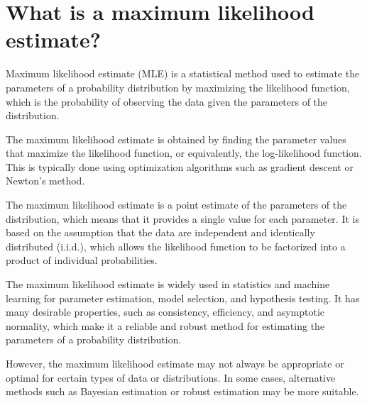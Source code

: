\section{What is a maximum likelihood estimate?}
Maximum likelihood estimate (MLE) is a statistical method used to estimate the parameters of a probability distribution by maximizing the likelihood function, which is the probability of observing the data given the parameters of the distribution.

The maximum likelihood estimate is obtained by finding the parameter values that maximize the likelihood function, or equivalently, the log-likelihood function. This is typically done using optimization algorithms such as gradient descent or Newton's method.

The maximum likelihood estimate is a point estimate of the parameters of the distribution, which means that it provides a single value for each parameter. It is based on the assumption that the data are independent and identically distributed (i.i.d.), which allows the likelihood function to be factorized into a product of individual probabilities.

The maximum likelihood estimate is widely used in statistics and machine learning for parameter estimation, model selection, and hypothesis testing. It has many desirable properties, such as consistency, efficiency, and asymptotic normality, which make it a reliable and robust method for estimating the parameters of a probability distribution.

However, the maximum likelihood estimate may not always be appropriate or optimal for certain types of data or distributions. In some cases, alternative methods such as Bayesian estimation or robust estimation may be more suitable.

